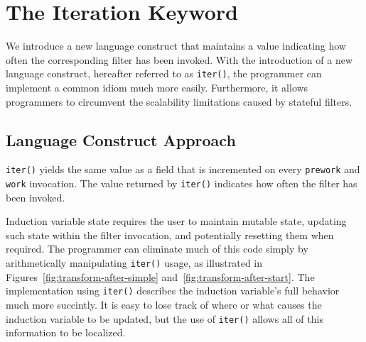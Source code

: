 %  
%
%
%
%
%
%    
%
%

\section{The Iteration Keyword}
\label{sec:iteration}
We introduce a new language construct that maintains a value 
indicating how often the corresponding filter has been invoked.  
With the introduction of a new language construct, hereafter referred to as {\tt iter()}, the programmer can implement a common idiom much more easily.  Furthermore, it allows programmers to circumvent the scalability limitations caused by stateful filters.

\subsection{Language Construct Approach}
{\tt iter()} yields the same value as a field that is incremented on every {\tt prework} and {\tt work} invocation.  The value returned by {\tt iter()} indicates how often the filter has been invoked.  

Induction variable state requires the user to maintain mutable state, updating such state within the filter invocation, and potentially resetting them when required. The programmer can eliminate much of this code simply by arithmetically manipulating {\tt iter()} usage, as illustrated in Figures~\ref{fig:transform-after-simple} and~\ref{fig:transform-after-start}.  The implementation using {\tt iter()} describes the induction variable's full behavior much more succintly.  It is easy to lose track of where or what causes the induction variable to be updated, but the use of {\tt iter()} allows all of this information to be localized.

